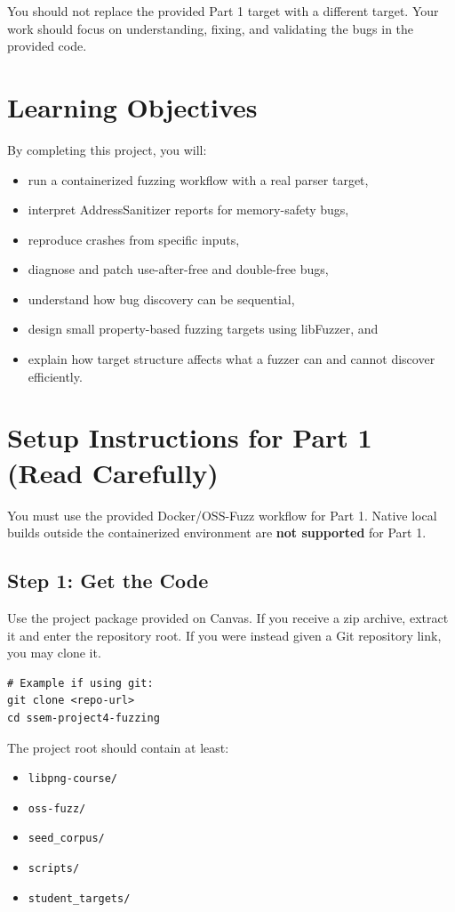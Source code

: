 \documentclass[11pt]{article}
\begin{document}
You should not replace the provided Part 1 target with a different target. Your work should focus on understanding, fixing, and validating the bugs in the provided code.

\section*{Learning Objectives}
By completing this project, you will:
\begin{itemize}
    \item run a containerized fuzzing workflow with a real parser target,
    \item interpret AddressSanitizer reports for memory-safety bugs,
    \item reproduce crashes from specific inputs,
    \item diagnose and patch use-after-free and double-free bugs,
    \item understand how bug discovery can be sequential,
    \item design small property-based fuzzing targets using libFuzzer, and
    \item explain how target structure affects what a fuzzer can and cannot discover efficiently.
\end{itemize}

\section*{Setup Instructions for Part 1 (Read Carefully)}
You must use the provided Docker/OSS-Fuzz workflow for Part 1. Native local builds outside the containerized environment are \textbf{not supported} for Part 1.

\subsection*{Step 1: Get the Code}
Use the project package provided on Canvas. If you receive a zip archive, extract it and enter the repository root. If you were instead given a Git repository link, you may clone it.

\begin{lstlisting}[style=bashstyle]
# Example if using git:
git clone <repo-url>
cd ssem-project4-fuzzing
\end{lstlisting}

The project root should contain at least:
\begin{itemize}
    \item \texttt{libpng-course/}
    \item \texttt{oss-fuzz/}
    \item \texttt{seed\_corpus/}
    \item \texttt{scripts/}
    \item \texttt{student\_targets/}
\end{itemize}
\end{document}
